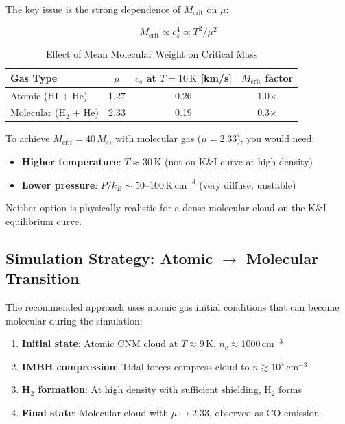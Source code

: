 \documentclass[11pt,a4paper]{article}
\newcommand{\Msun}{M_\odot}
\begin{document}
The key issue is the strong dependence of $M_\mathrm{crit}$ on $\mu$:

\begin{equation}
    M_\mathrm{crit} \propto c_s^4 \propto T^2 / \mu^2
\end{equation}

\begin{table}[h]
\centering
\caption{Effect of Mean Molecular Weight on Critical Mass}
\begin{tabular}{lccc}
\toprule
\textbf{Gas Type} & \textbf{$\mu$} & \textbf{$c_s$ at $T = 10\,\mathrm{K}$ [km/s]} & \textbf{$M_\mathrm{crit}$ factor} \\
\midrule
Atomic (HI + He) & 1.27 & 0.26 & 1.0$\times$ \\
Molecular (H$_2$ + He) & 2.33 & 0.19 & 0.3$\times$ \\
\bottomrule
\end{tabular}
\end{table}

To achieve $M_\mathrm{crit} = 40\,\Msun$ with molecular gas ($\mu = 2.33$), you would need:
\begin{itemize}
    \item \textbf{Higher temperature}: $T \approx 30\,\mathrm{K}$ (not on K\&I curve at high density)
    \item \textbf{Lower pressure}: $P/k_B \sim 50$--$100\,\mathrm{K\,cm}^{-3}$ (very diffuse, unstable)
\end{itemize}

Neither option is physically realistic for a dense molecular cloud on the K\&I equilibrium curve.

\subsection{Simulation Strategy: Atomic $\to$ Molecular Transition}

The recommended approach uses atomic gas initial conditions that can become molecular
during the simulation:

\begin{enumerate}
    \item \textbf{Initial state}: Atomic CNM cloud at $T \approx 9\,\mathrm{K}$, $n_c \approx 1000\,\mathrm{cm}^{-3}$
    \item \textbf{IMBH compression}: Tidal forces compress cloud to $n \gtrsim 10^4\,\mathrm{cm}^{-3}$
    \item \textbf{H$_2$ formation}: At high density with sufficient shielding, H$_2$ forms
    \item \textbf{Final state}: Molecular cloud with $\mu \to 2.33$, observed as CO emission
\end{enumerate}
\end{document}
